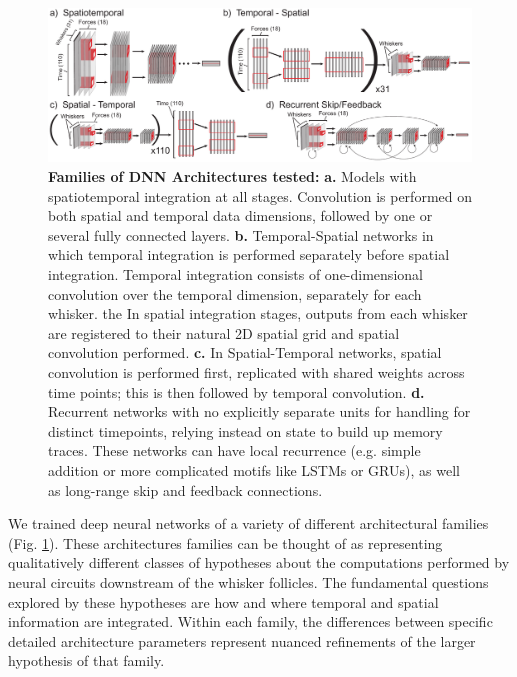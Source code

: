 \begin{figure}
\centering
\includegraphics [width=1\linewidth]{figures/architectures.pdf}
\vspace{-2mm}
\caption{\textbf{Families of DNN Architectures tested:} \textbf{a.} Models with spatiotemporal integration at all stages. Convolution is performed on both spatial and temporal data dimensions, followed by one or several fully connected layers. \textbf{b.} Temporal-Spatial networks in which temporal integration is performed separately before spatial integration.  Temporal integration consists of one-dimensional convolution over the temporal dimension, separately for each whisker. the In spatial integration stages, outputs from each whisker are registered to their natural 2D spatial grid and spatial convolution performed.  \textbf{c.} In Spatial-Temporal networks, spatial convolution is performed first, replicated with shared weights across time points; this is then followed by temporal convolution. \textbf{d.} Recurrent networks with no explicitly separate units for handling for distinct timepoints, relying instead on state to build up memory traces.  These networks can have local recurrence (e.g. simple addition or more complicated motifs like LSTMs or GRUs), as well as long-range skip and feedback connections.~\label{fig_archi}}
\end{figure}

We trained deep neural networks of a variety of different architectural families (Fig. \ref{fig_archi}).  
These architectures families can be thought of as representing qualitatively different classes of hypotheses about the computations performed by neural circuits downstream of the whisker follicles. 
The fundamental questions explored by these hypotheses are how and where temporal and spatial information are integrated.
Within each family, the differences between specific detailed architecture parameters represent nuanced refinements of the larger hypothesis of that family. 
 
